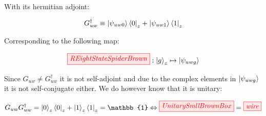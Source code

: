 \documentclass[]{article}
\begin{document}
With its hermitian adjoint:

\begin{equation}
G_{uw}^\dagger \equiv \ket{\psi_{uw0}}\bra{0}_z + \ket{\psi_{uw1}}\bra{1}_z
\end{equation}

Corresponding to the following map:

\begin{equation}
\tikzfig{REightStateSpiderBrown} :
\ket{g}_z \mapsto \ket{\psi_{uwg}}
\end{equation}

Since $G_{uw} \neq G_{uw}^\dagger$ it is not self-adjoint and due to the complex elements in $\ket{\psi_{uwg}}$ it is not self-conjugate either. We do however know that it is unitary:

\begin{equation}
	G_{uw}G_{uw}^\dagger = \ket{0}_z\bra{0}_z + \ket{1}_z\bra{1}_z = \mathbb{1} \Leftrightarrow \tikzfig{UnitarySmllBrownBox} = \tikzfig{wire}
\end{equation}
\end{document}
